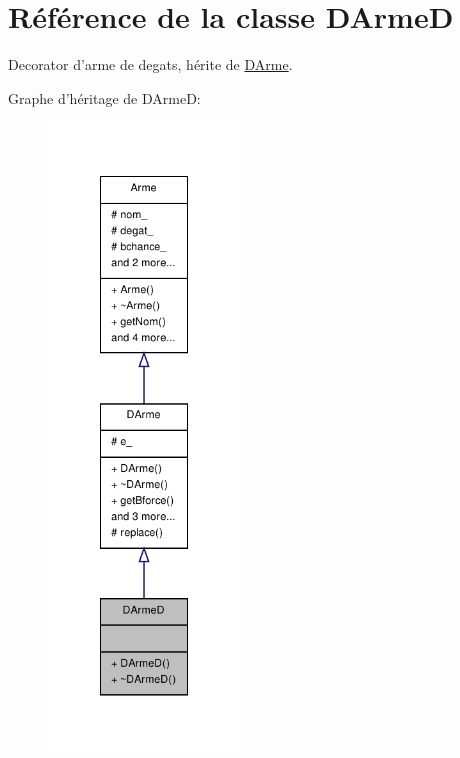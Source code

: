 \hypertarget{class_d_arme_d}{\section{Référence de la classe D\-Arme\-D}
\label{class_d_arme_d}
}


Decorator d'arme de degats, hérite de \hyperlink{class_d_arme}{D\-Arme}.  




Graphe d'héritage de D\-Arme\-D\-:
\nopagebreak
\begin{figure}[H]
\begin{center}
\leavevmode
\includegraphics[width=144pt]{class_d_arme_d__inherit__graph}
\end{center}
\end{figure}


